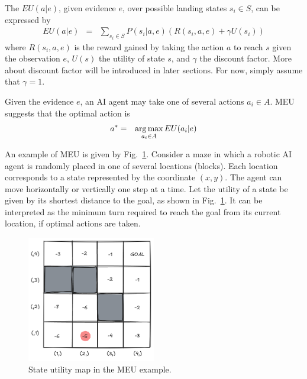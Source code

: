 The  $EU(a|e)$, given evidence $e$, over possible landing states $s_i \in S$, can be expressed by
\begin{eqnarray}
	EU(a|e) &=& \sum_{s_i \in S} P(s_i|a,e) \left(R(s_i,a,e) + \gamma U(s_i)\right) \label{eq:expected_utility}
\end{eqnarray}
where $R(s_i,a,e)$ is the reward gained by taking the action $a$ to reach $s$ given the observation $e$, $U(s)$ the utility of state $s$, and $\gamma$ the discount factor. More about discount factor will be introduced in later sections. For now, simply assume that $\gamma = 1$. 

Given the evidence $e$, an AI agent may take one of several actions $a_i \in A$. MEU suggests that the optimal action is
\begin{eqnarray}
	a^* &=& \operatorname*{arg\,max}_{a_i \in A} EU(a_i|e) \label{eq:emu}
\end{eqnarray}

An example of MEU is given by Fig.~\ref{fig:emuexp}. Consider a maze in which a robotic AI agent is randomly placed in one of several locations (blocks). Each location corresponds to a state represented by the coordinate $(x,y)$. The agent can move horizontally or vertically one step at a time. Let the utility of a state be given by its shortest distance to the goal, as shown in Fig.~\ref{fig:emuexp}. It can be interpreted as the minimum turn required to reach the goal from its current location, if optimal actions are taken.

\begin{figure}[!htb]
	\centering
	\includegraphics[width=0.5\textwidth]{./chapters/part-1/figures/emuexp.png}
	\caption{State utility map in the MEU example.}
	\label{fig:emuexp}
\end{figure}


